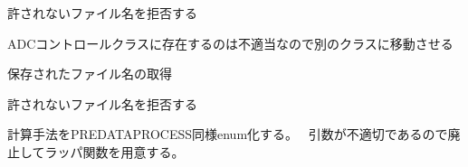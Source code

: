 
\begin{DoxyRefList}
\item[\label{todo__todo000002}%
\Hypertarget{todo__todo000002}%
メンバ \hyperlink{class_t_k_a_d_c_c_o_n_t_r_o_l_afa385509f61162198950676d279f4c3c}{T\+K\+A\+D\+C\+C\+O\+N\+T\+R\+OL\+:\+:Delete} (std\+::string file\+\_\+name)]許されないファイル名を拒否する  
\item[\label{todo__todo000003}%
\Hypertarget{todo__todo000003}%
メンバ \hyperlink{class_t_k_a_d_c_c_o_n_t_r_o_l_afbeba1999b1d5afeda2d3b755d20b2ce}{T\+K\+A\+D\+C\+C\+O\+N\+T\+R\+OL\+:\+:Get\+Last\+Local\+Shot\+Number} ()]A\+D\+Cコントロールクラスに存在するのは不適当なので別のクラスに移動させる  
\item[\label{todo__todo000001}%
\Hypertarget{todo__todo000001}%
メンバ \hyperlink{class_t_k_a_d_c_c_o_n_t_r_o_l_a832915af5a7240efeef5c3fa139b99af}{T\+K\+A\+D\+C\+C\+O\+N\+T\+R\+OL\+:\+:Save\+Shot} (std\+::string file\+\_\+name)]保存されたファイル名の取得 

許されないファイル名を拒否する  
\item[\label{todo__todo000004}%
\Hypertarget{todo__todo000004}%
メンバ \hyperlink{class_t_k_a_n_a_l_y_z_e_ae7ea90bd92b92e5e75f89a5c5c6bbabb}{T\+K\+A\+N\+A\+L\+Y\+ZE\+:\+:calc\+Surface\+Area} (T\+K\+Charged\+Particle\+Type particle\+\_\+type)]計算手法を\+P\+R\+E\+D\+A\+T\+A\+P\+R\+O\+C\+E\+S\+S同様enum化する。~\newline
 引数が不適切であるので廃止してラッパ関数を用意する。 
\end{DoxyRefList}